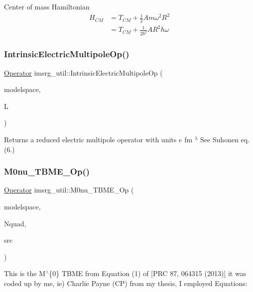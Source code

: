 Center of mass Hamiltonian \begin{align*} H_{CM} &= T_{CM} + \frac{1}{2} Am\omega^2 R^2 \\ &= T_{CM} + \frac{1}{2b^2} AR^2 \hbar\omega \end{align*} \mbox{\label{namespaceimsrg__util_a1360d9a1bfc4b4f99f64078f50f47c3d}} 
\subsubsection{\texorpdfstring{Intrinsic\+Electric\+Multipole\+Op()}{IntrinsicElectricMultipoleOp()}}
{\footnotesize\ttfamily \hyperlink{classOperator}{Operator} imsrg\+\_\+util\+::\+Intrinsic\+Electric\+Multipole\+Op (\begin{DoxyParamCaption}\item[{\hyperlink{classModelSpace}{Model\+Space} \&}]{modelspace,  }\item[{int}]{L }\end{DoxyParamCaption})}

Returns a reduced electric multipole operator with units $ e$ fm $^{\lambda} $ See Suhonen eq. (6.) \mbox{\label{namespaceimsrg__util_ab286571384270b07d5b002c8c6f6dca2}} 
\subsubsection{\texorpdfstring{M0nu\+\_\+\+T\+B\+M\+E\+\_\+\+Op()}{M0nu\_TBME\_Op()}}
{\footnotesize\ttfamily \hyperlink{classOperator}{Operator} imsrg\+\_\+util\+::\+M0nu\+\_\+\+T\+B\+M\+E\+\_\+\+Op (\begin{DoxyParamCaption}\item[{\hyperlink{classModelSpace}{Model\+Space} \&}]{modelspace,  }\item[{int}]{Nquad,  }\item[{string}]{src }\end{DoxyParamCaption})}

This is the M$^\wedge$\{0\} T\+B\+ME from Equation (1) of \mbox{[}P\+RC 87, 064315 (2013)\mbox{]} it was coded up by me, ie) Charlie Payne (CP) from my thesis, I employed Equations\+: \mbox{\label{namespaceimsrg__util_ad8388f2d1ee6937ea106fcc59c9aeb1a}} 
